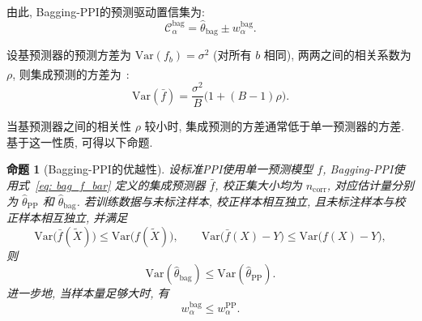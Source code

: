 \documentclass[a4paper, AutoFakeBold, UTF8]{ctexrep}
\theoremstyle{plain}
\newtheorem{prop}{命题}[chapter]
\newcommand{\upcite}[1]
{\textsuperscript{~\cite{#1}}}
\numberwithin{equation}{chapter}
\begin{document}
由此, Bagging-PPI的预测驱动置信集为: 
\begin{equation}
\mathcal{C}_{\alpha}^{\text{bag}} = \hat{\theta}_{\text{bag}} \pm w_{\alpha}^{\text{bag}}. \label{eq: C_bag}
\end{equation}

设基预测器的预测方差为 $\mathrm{Var} (f_b)  = \sigma^2$ (对所有 $b$ 相同), 两两之间的相关系数为 $\rho$, 则集成预测的方差为\upcite{Breiman1996}: 
\begin{equation}
\mathrm{Var} (\bar{f})  = \frac{\sigma^2}{B}\bigl (1 +  (B-1) \rho\bigr). \label{eq: bag_var}
\end{equation}

当基预测器之间的相关性 $\rho$ 较小时, 集成预测的方差通常低于单一预测器的方差. 基于这一性质, 可得以下命题. 

\begin{prop}[Bagging-PPI的优越性]
\label{prop: bagging_improvement}
设标准PPI使用单一预测模型 $f$, Bagging-PPI使用式~\eqref{eq: bag_f_bar} 定义的集成预测器 $\bar f$, 校正集大小均为 $n_{\text{corr}}$, 对应估计量分别为 $\hat{\theta}_{\mathrm{PP}}$ 和 $\hat{\theta}_{\mathrm{bag}}$. 若训练数据与未标注样本, 校正样本相互独立, 且未标注样本与校正样本相互独立, 并满足
\begin{equation}
\mathrm{Var}\bigl (\bar f (\tilde X) \bigr) \le \mathrm{Var}\bigl (f (\tilde X) \bigr), \qquad
\mathrm{Var}\bigl (\bar f (X) -Y\bigr) \le \mathrm{Var}\bigl (f (X) -Y\bigr), 
\label{eq: bagging_condition}
\end{equation}
则
\begin{equation}
\mathrm{Var} (\hat{\theta}_{\mathrm{bag}}) \le \mathrm{Var} (\hat{\theta}_{\mathrm{PP}}) .
\label{eq: bagging_var_improvement}
\end{equation}
进一步地, 当样本量足够大时, 有
\begin{equation}
w_\alpha^{\mathrm{bag}}\le w_\alpha^{\mathrm{PP}}.
\label{eq: bagging_improvement}
\end{equation}
\end{prop}
\end{document}
